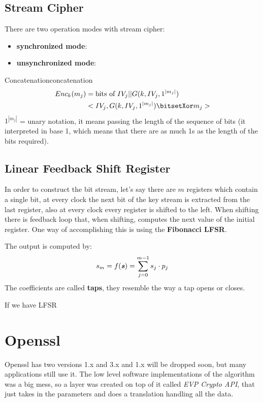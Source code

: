 \documentclass[12pt]{article}
\begin{document}
\subsection{Stream Cipher}
There are two operation modes with stream cipher:
\begin{itemize}
  \item \textbf{synchronized mode}:
  \item \textbf{unsynchronized mode}:
\end{itemize}

\begin{definition}{Concatenation}{concatenation}
  \begin{align*}
    Enc_k(m_j) &= \text{bits of }IV_j || G(k, IV_j, 1^{|m_j|}) \\
    & <IV_j, G(k, IV_j, 1^{|m_j|}) \bitsetXor m_j>
  \end{align*}
  $1^{|m_j|}$ = unary notation, it means passing the length of the sequence of bits (it interpreted in base 1, which means that there are as much 1s as the length of the bits required).
\end{definition}


\subsection{Linear Feedback Shift Register}
In order to construct the bit stream, let's say there are $m$ registers which contain a single bit, at every clock the next bit of the key stream is extracted from the last register, also at every clock every register is shifted to the left. When shifting there is feedback loop that, when shifting, computes the next value of the initial register. One way of accomplishing this is using the \textbf{Fibonacci LFSR}.

The output is computed by:
\[ s_m = f(\textbf{\textit{s}}) = \sum_{j=0}^{m-1} s_j \cdot p_j \]
The coefficients are called \textbf{taps}, they resemble the way a tap opens or closes.

If we have LFSR 










\section{Openssl}
Openssl has two versions 1.x and 3.x and 1.x will be dropped soon, but many applications still use it. The low level software implementations of the algorithm was a big mess, so a layer was created on top of it called \emph{EVP Crypto API}, that just takes in the parameters and does a translation handling all the data.
\end{document}
